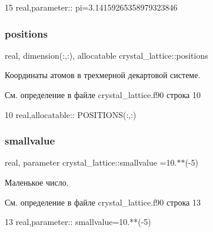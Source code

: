 \begin{DoxyCode}
15 \textcolor{keywordtype}{real},\textcolor{keywordtype}{parameter}:: pi=3.14159265358979323846
\end{DoxyCode}
\mbox{\label{namespacecrystal__lattice_a65687f01a2e1edcce4350543b69ef312}} 
\subsubsection{\texorpdfstring{positions}{positions}}
{\footnotesize\ttfamily real, dimension(\+:,\+:), allocatable crystal\+\_\+lattice\+::positions}



Координаты атомов в трехмерной декартовой системе. 



См. определение в файле crystal\+\_\+lattice.\+f90 строка 10


\begin{DoxyCode}
10 \textcolor{keywordtype}{real},\textcolor{keywordtype}{allocatable}:: POSITIONS(:,:)
\end{DoxyCode}
\mbox{\label{namespacecrystal__lattice_ac13001be81194a82292d9ca561b000d3}} 
\subsubsection{\texorpdfstring{smallvalue}{smallvalue}}
{\footnotesize\ttfamily real, parameter crystal\+\_\+lattice\+::smallvalue =10.$\ast$$\ast$(-\/5)}



Маленькое число. 



См. определение в файле crystal\+\_\+lattice.\+f90 строка 13


\begin{DoxyCode}
13 \textcolor{keywordtype}{real},\textcolor{keywordtype}{parameter}:: smallvalue=10.**(-5)
\end{DoxyCode}
\mbox{\label{namespacecrystal__lattice_a8ff442188723d34f67cad873e47bb5ad}} 
